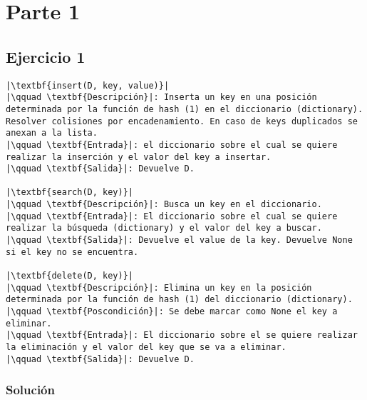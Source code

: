\documentclass{article}
\begin{document}


\section*{Parte 1}
\subsection*{Ejercicio 1}

\begin{lstlisting}
|\textbf{insert(D, key, value)}|
|\qquad \textbf{Descripción}|: Inserta un key en una posición determinada por la función de hash (1) en el diccionario (dictionary). Resolver colisiones por encadenamiento. En caso de keys duplicados se anexan a la lista.
|\qquad \textbf{Entrada}|: el diccionario sobre el cual se quiere realizar la inserción y el valor del key a insertar.        
|\qquad \textbf{Salida}|: Devuelve D.

|\textbf{search(D, key)}|
|\qquad \textbf{Descripción}|: Busca un key en el diccionario.
|\qquad \textbf{Entrada}|: El diccionario sobre el cual se quiere realizar la búsqueda (dictionary) y el valor del key a buscar.
|\qquad \textbf{Salida}|: Devuelve el value de la key. Devuelve None si el key no se encuentra.        

|\textbf{delete(D, key)}|
|\qquad \textbf{Descripción}|: Elimina un key en la posición determinada por la función de hash (1) del diccionario (dictionary).
|\qquad \textbf{Poscondición}|: Se debe marcar como None el key a eliminar.
|\qquad \textbf{Entrada}|: El diccionario sobre el se quiere realizar la eliminación y el valor del key que se va a eliminar.
|\qquad \textbf{Salida}|: Devuelve D.
\end{lstlisting}
\subsubsection*{Solución}
\end{document}
